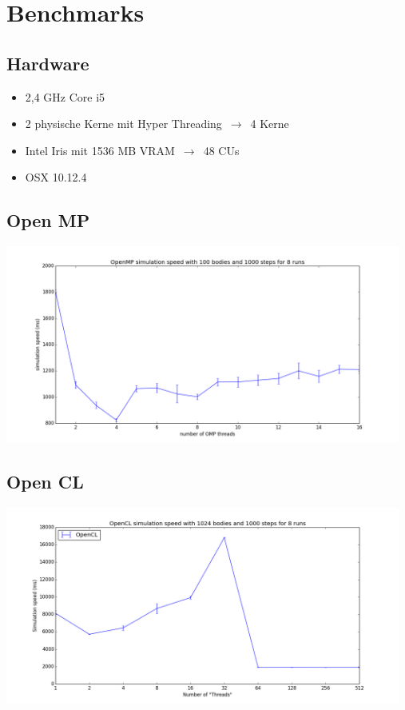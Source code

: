\documentclass{beamer}
\begin{document}
\section{Benchmarks}
\subsection{Hardware}
\begin{frame}
\begin{itemize}
  \item 2,4 GHz Core i5
  \item 2 physische Kerne mit Hyper Threading $\,\to\,$ 4 Kerne
  \item Intel Iris mit 1536 MB VRAM $\,\to\,$ 48 CUs
  \item OSX 10.12.4
\end{itemize}
\end{frame}

\subsection{Open MP}
\begin{frame}
\includegraphics[width=13cm]{img/fig_omp_100b_1000s_8r.png}
\end{frame}

\subsection{Open CL}
\begin{frame}
\includegraphics[width=13cm]{img/fig_ocl_1024b_1000s_8r.png}
\end{frame}
\end{document}

